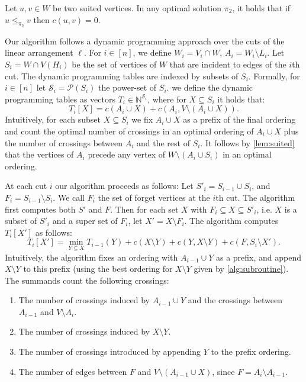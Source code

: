 \documentclass[a4paper,UKenglish,cleveref, autoref, thm-restate]{lipics-v2021}
\newcommand{\layertwo}{\ensuremath{W}}
\begin{document}
\begin{lemma}\label{lem:suited}
    Let $u,v \in \layertwo$ be two suited vertices. In any optimal solution $\pi_2$, it holds that if $u\leq_{\pi_2} v$ then $c(u,v) = 0$.
\end{lemma}
Our algorithm follows a dynamic programming approach over the cuts of the linear arrangement $\ell$.
For $i\in[n]$, we define $\layertwo_i = V_i \cap \layertwo$, $A_i = \layertwo_i\setminus L_i$. Let $S_i = \layertwo \cap V(H_i)$ be the set of vertices of $\layertwo$ that are incident to edges of the $i$th cut.
The dynamic programming tables are indexed by subsets of $S_i$.
Formally, for $i\in [n]$ let $\mathcal{S}_i = \mathcal{P}(S_i)$ the power-set of $S_i$. we define the dynamic programming tables as vectors $T_i \in \mathbb{N}^{\mathcal{S}_i}$, where for $X\subseteq S_i$ it holds that:
\begin{equation} \label{eq:t-def}
T_i[X] = c(A_i\cup X) + c(A_i, V\setminus (A_i\cup X)).
\end{equation}
Intuitively, for each subset $X \subseteq S_i$ we fix $A_i\cup X$ as a prefix of the final ordering and count the optimal number of crossings in an optimal ordering of $A_i \cup X$ plus the number of crossings between $A_i$ and the rest of $S_i$. It follows by \cref{lem:suited} that the vertices of $A_i$ precede any vertex of $W\setminus (A_i\cup S_i)$ in an optimal ordering.

At each cut $i$ our algorithm proceeds as follows: 
Let $S'_i = S_{i-1} \cup S_i$, and $F_i = S_{i-1} \setminus S_{i}$. We call $F_i$ the set of forget vertices at the $i$th cut. The algorithm first computes both $S'$ and $F$. Then for each set $X$ with $F_i \subseteq X \subseteq S'_i$, i.e. $X$ is a subset of $S'_i$ and a super set of $F_i$, let $X' = X\setminus F_i$. The algorithm computes $T_{i}[X']$ as follows:
\begin{equation} \label{eq:t-rec}
    T_i[X'] = \min\limits_{Y\subseteq X}  T_{i-1}(Y) + c(X\setminus Y) + c(Y, X\setminus Y) + c(F, S_i \setminus X').
\end{equation}
Intuitively, the algorithm fixes an ordering with $A_{i-1} \cup Y$ as a prefix, and append $X \setminus Y$ to this prefix (using the best ordering for $X\setminus Y$ given by \cref{alg:subroutine}). The summands count the following crossings:
\begin{enumerate}
    \item The number of crossings induced by $A_{i-1}\cup Y$ and the crossings between $A_{i-1}$ and $V\setminus A_i$.
    \item The number of crossings induced by $X\setminus Y$.
    \item The number of crossings introduced by appending $Y$ to the prefix ordering.
    \item The number of edges between $F$ and $V\setminus (A_{i-1}\cup X)$, since $F = A_i \setminus A_{i-1}$.
\end{enumerate}
\end{document}
